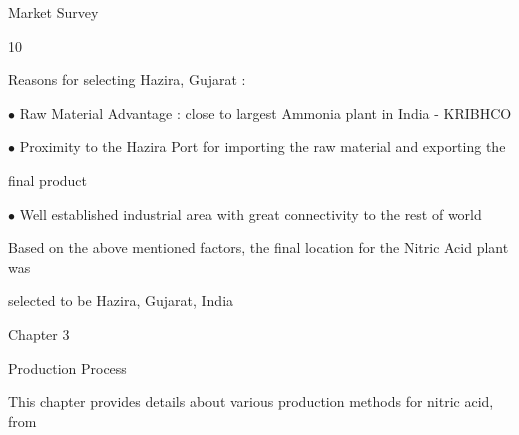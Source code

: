 \documentclass[a4paper,portrait,12pt]{article}
\begin{document}
\begin{flushleft}
\newpage
Market Survey
\end{flushleft}





10





\begin{flushleft}
Reasons for selecting Hazira, Gujarat :
\end{flushleft}


\begin{flushleft}
$\bullet$ Raw Material Advantage : close to largest Ammonia plant in India - KRIBHCO
\end{flushleft}


\begin{flushleft}
$\bullet$ Proximity to the Hazira Port for importing the raw material and exporting the
\end{flushleft}


\begin{flushleft}
final product
\end{flushleft}


\begin{flushleft}
$\bullet$ Well established industrial area with great connectivity to the rest of world
\end{flushleft}





\begin{flushleft}
Based on the above mentioned factors, the final location for the Nitric Acid plant was
\end{flushleft}


\begin{flushleft}
selected to be Hazira, Gujarat, India
\end{flushleft}





\begin{flushleft}
\newpage
Chapter 3
\end{flushleft}





\begin{flushleft}
Production Process
\end{flushleft}


\begin{flushleft}
This chapter provides details about various production methods for nitric acid, from
\end{flushleft}
\end{document}
